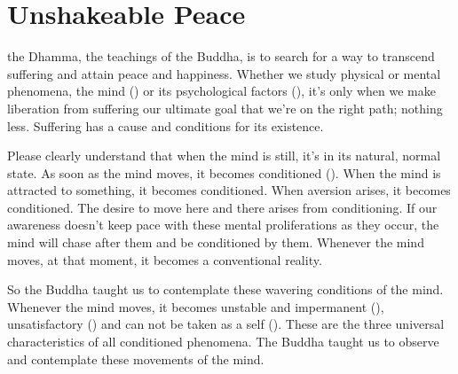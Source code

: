 

\chapter{Unshakeable Peace}

 the Dhamma, the teachings of the Buddha, is to search for a way to transcend suffering and attain peace and happiness. Whether we study physical or mental phenomena, the mind () or its psychological factors (), it's only when we make liberation from suffering our ultimate goal that we're on the right path; nothing less. Suffering has a cause and conditions for its existence. 

Please clearly understand that when the mind is still, it's in its natural, normal state. As soon as the mind moves, it becomes conditioned (). When the mind is attracted to something, it becomes conditioned. When aversion arises, it becomes conditioned. The desire to move here and there arises from conditioning. If our awareness doesn't keep pace with these mental proliferations as they occur, the mind will chase after them and be conditioned by them. Whenever the mind moves, at that moment, it becomes a conventional reality. 

So the Buddha taught us to contemplate these wavering conditions of the mind. Whenever the mind moves, it becomes unstable and impermanent (), unsatisfactory () and can not be taken as a self (). These are the three universal characteristics of all conditioned phenomena. The Buddha taught us to observe and contemplate these movements of the mind. 

